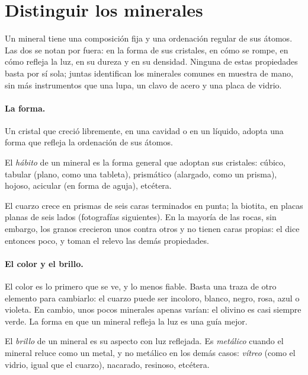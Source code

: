 \section{Distinguir los minerales}

Un mineral tiene una composición fija y una ordenación regular de sus átomos.
Las dos se notan por fuera: en la forma de sus cristales, en cómo se rompe, en
cómo refleja la luz, en su dureza y en su densidad. Ninguna de estas
propiedades basta por sí sola; juntas identifican los minerales comunes en
muestra de mano, sin más instrumentos que una lupa, un clavo de acero y una
placa de vidrio.

\paragraph{La forma.} Un cristal que creció libremente, en una cavidad o en un
líquido, adopta una forma que refleja la ordenación de sus átomos.

\begin{definition}[Hábito]\label{def:g11:minerals:habit}
El \emph{hábito} de un mineral es la forma general
que adoptan sus cristales: cúbico, tabular (plano, como una tableta),
prismático (alargado, como un prisma), hojoso, acicular (en forma de aguja),
etcétera.
\end{definition}

El cuarzo crece en prismas de seis caras terminados en punta; la biotita, en
placas planas de seis lados (fotografías siguientes). En la mayoría de las
rocas, sin embargo, los granos crecieron unos contra otros y no tienen caras
propias: el  dice entonces poco, y toman el relevo las demás
propiedades.

\paragraph{El color y el brillo.} El color es lo primero que se ve, y lo menos
fiable. Basta una traza de otro elemento para cambiarlo: el cuarzo puede ser
incoloro, blanco, negro, rosa, azul o violeta. En cambio, unos pocos minerales
apenas varían: el olivino es casi siempre verde. La forma en que un mineral
refleja la luz es una guía mejor.

\begin{definition}[Brillo]\label{def:g11:minerals:lustre}
El \emph{brillo} de un mineral es su aspecto con luz reflejada.
Es \emph{metálico} cuando el mineral reluce como un metal, y no metálico en
los demás casos: \emph{vítreo} (como el vidrio, igual que el cuarzo),
nacarado, resinoso, etcétera.
\end{definition}


